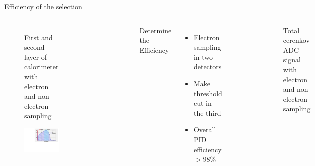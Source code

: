 \documentclass{beamer}
\begin{document}
\begin{frame}{Efficiency of the selection}
	\begin{block}{}
		\begin{columns}
			\vspace{-18pt}
			\begin{figure}
				First and second layer of calorimeter with electron and non-electron sampling \par\medskip
				\includegraphics[width=4.50cm]{../images/Lprl1.pdf}
			\end{figure}
			\vspace{-23pt}
			\begin{figure}
				\includegraphics[width=4.50cm]{../images/Lprl2.pdf}
			\end{figure}
			Determine the Efficiency
			
			\begin{itemize}
				\item Electron sampling in two detectors
				\item Make threshold cut in the third
				\item Overall PID efficiency $> 98\% $
			\end{itemize}
			\vspace{-16pt}
			\begin{figure}
				\includegraphics[width=5.50cm]{../images/Lcerasum.pdf}
			\end{figure}
			\vspace{-16pt}
			Total cerenkov ADC signal with electron and non-electron sampling \par\medskip
		\end{columns}
	\end{block}
\end{frame}
\end{document}

